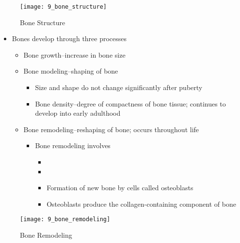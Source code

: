 \documentclass[title={Chapter 9}]{fdsn201notes}
\begin{document}
\begin{figure}[H]
	\centering
	\texttt{[image: 9\_bone\_structure]}
	\caption{Bone Structure}
	\label{fig:bone-structure}
\end{figure}

\begin{itemize}
	\item Bones develop through three processes
	\begin{itemize}
		\item Bone growth--increase in bone size
		\item Bone modeling--shaping of bone
		\begin{itemize}
			\item Size and shape do not change significantly after puberty
			\item Bone density--degree of compactness of bone tissue; continues to develop into early adulthood
		\end{itemize}
		\item Bone remodeling--reshaping of bone; occurs throughout life
		\begin{itemize}
			\item Bone remodeling involves
			\begin{itemize}
				\item {}
				\item {}
				\item Formation of new bone by cells called osteoblasts
				\item Osteoblasts produce the collagen-containing component of bone
			\end{itemize}
		\end{itemize}
	\end{itemize}
\end{itemize}

\begin{figure}[H]
	\centering
	\texttt{[image: 9\_bone\_remodeling]}
	\caption{Bone Remodeling}
	\label{fig:bone-remodeling}
\end{figure}
\end{document}
